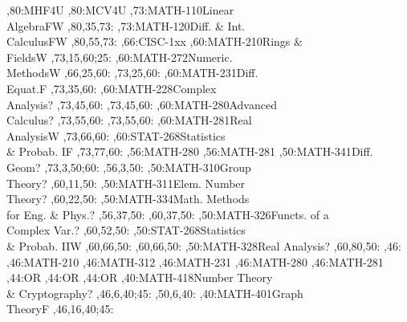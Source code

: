 \documentclass{article}
\begin{document}
\thispagestyle{empty}
\begin{chart}
,80:{MHF4U}
,80:{MCV4U}
,73:{MATH-110}{Linear\\Algebra}{FW}
  ,80,35,73:
,73:{MATH-120}{Diff. \& Int.\\Calculus}{FW}
  ,80,55,73:
,66:{CISC-1xx}
,60:{MATH-210}{Rings \&\\Fields}{W}
  ,73,15,60;25:
,60:{MATH-272}{Numeric.\\Methods}{W}
  ,66,25,60:
  ,73,25,60:
,60:{MATH-231}{Diff.\\Equat.}{F}
  ,73,35,60:
,60:{MATH-228}{Complex\\Analysis}{?}
  ,73,45,60:
  ,73,45,60:
,60:{MATH-280}{Advanced\\Calculus}{?}
  ,73,55,60:
  ,73,55,60:
,60:{MATH-281}{Real\\Analysis}{W}
  ,73,66,60:
,60:{STAT-268}{Statistics\\\& Probab. I}{F}
  ,73,77,60:
,56:{MATH-280}
,56:{MATH-281}
,50:{MATH-341}{Diff.\\Geom}{?}
  ,73,3,50;60:
  ,56,3,50:
,50:{MATH-310}{Group\\Theory}{?}
  ,60,11,50:
,50:{MATH-311}{Elem. Number\\Theory}{?}
  ,60,22,50:
,50:{MATH-334}{Math. Methods\\for Eng. \& Phys.}{?}
  ,56,37,50:
  ,60,37,50:
,50:{MATH-326}{Functs. of a\\Complex Var.}{?}
  ,60,52,50:
,50:{STAT-268}{Statistics\\\& Probab. II}{W}
  ,60,66,50:
  ,60,66,50:
,50:{MATH-328}{Real Analysis}{?}
  ,60,80,50:
,46:{}
,46:{MATH-210}
,46:{MATH-312}
,46:{MATH-231}
,46:{MATH-280}
,46:{MATH-281}
,44:{OR}
,44:{OR}
,44:{OR}
,40:{MATH-418}{Number Theory\\\& Cryptography}{?}
  ,46,6,40;45:
  ,50,6,40:
,40:{MATH-401}{Graph\\Theory}{F}
  ,46,16,40;45:

\end{chart}
\end{document}
